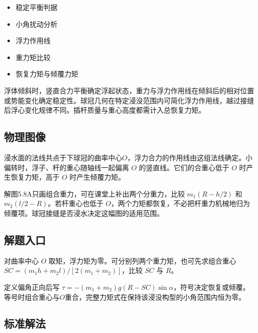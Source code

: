 \documentclass[UTF8,fontset=fandol,a4paper,11pt]{ctexart}
\providecommand{\tightlist}{\setlength{\itemsep}{0pt}\setlength{\parskip}{0pt}}
\begin{document}
\begin{itemize}
\tightlist
\item
  稳定平衡判据
\item
  小角扰动分析
\item
  浮力作用线
\item
  重力矩比较
\item
  恢复力矩与倾覆力矩
\end{itemize}

浮体倾斜时，竖直合力平衡确定浮起状态，重力与浮力作用线在倾斜后的相对位置或势能变化确定稳定性。球冠几何在特定浸没范围内可简化浮力作用线，越过接缝后浮心变化规律不同。插杆质量与重心高度都需计入总恢复力矩。




\subsection*{物理图像}

浸水面的法线共点于下球冠的曲率中心$O$，浮力合力的作用线由这组法线确定。小偏转时，浮子、杆的重心随轴线一起偏离 $O$ 的竖直线。它们的合重心低于 $O$ 时产生恢复力矩，高于 $O$ 时产生倾覆力矩。

解图5.8A只画组合重力，可在课堂上补出两个分重力，比较 $m_1(R-h/2)$ 和 $m_2(l/2-R)$。若杆重心也低于 $O$，两个力矩都恢复，不必把杆重力机械地归为倾覆项。球冠接缝是否浸水决定这幅图的适用范围。



\subsection*{解题入口}

对曲率中心 $O$ 取矩，浮力矩为零。可分别列两个重力矩，也可先求组合重心 $SC=(m_1h+m_2l)/[2(m_1+m_2)]$，比较 $SC$ 与 $R$。

定义偏角正向后写 $\tau=-(m_1+m_2)g(R-SC)\sin\alpha$，符号决定恢复或倾覆。等号时组合重心与$O$重合，完整力矩式在保持该浸没构型的小角范围内恒为零。



\subsection*{标准解法}
\end{document}
